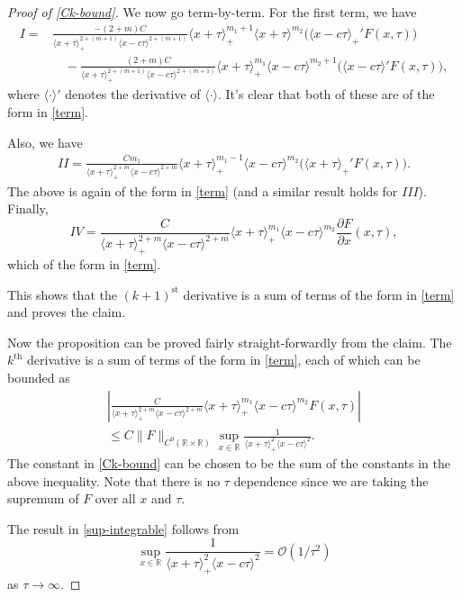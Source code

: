 \documentclass[oneside,reqno]{amsart}
\newcommand{\R}{\mathbb{R}}
\begin{document}
\begin{proof}[Proof of \cref{Ck-bound}]
	We now go term-by-term. For the first term, we have
	\begin{align*}
		I =& \frac {-(2+m)C} {\langle x +\tau\rangle_+^{2+(m+1)} \langle x -c\tau \rangle^{2+(m+1)}}\langle x + \tau \rangle_+^{m_1+1}\langle x+\tau\rangle^{m_2} \Big(\langle x-c\tau\rangle_+'F(x,\tau)\Big) \\
		&\quad-\frac {(2+m)C} {\langle x +\tau\rangle_+^{2+(m+1)} \langle x -c\tau \rangle^{2+(m+1)}}\langle x + \tau \rangle_+^{m_1}\langle x-c\tau\rangle^{m_2+1} \Big(\langle x-c\tau\rangle'F(x,\tau)\Big),
	\end{align*}
	where \(\langle \cdot \rangle'\) denotes the derivative of \(\langle \cdot \rangle\). It's clear that both of these are of the form in \cref{term}.
	
	Also, we have 
	\begin{align*}
		II = \frac {Cm_1} {\langle x +\tau\rangle_+^{2+m} \langle x -c\tau \rangle^{2+m}}\langle x + \tau \rangle_+^{m_1-1}\langle x-c\tau\rangle^{m_2} \Big( \langle x+\tau\rangle_+'F(x,\tau)\Big).
	\end{align*}
	The above is again of the form in \cref{term} (and a similar result holds for \(III\)). Finally,
	\begin{equation*}
		IV = \frac C {\langle x +\tau\rangle_+^{2+m} \langle x -c\tau \rangle^{2+m}}\langle x + \tau \rangle_+^{m_1}\langle x-c\tau\rangle^{m_2} \frac{\partial F}{\partial x}(x,\tau),
	\end{equation*}
	which of the form in \cref{term}.
	
	This shows that the \((k+1)^\text{st}\) derivative is a sum of terms of the form in \cref{term} and proves the claim.
	
	Now the proposition can be proved fairly straight-forwardly from the claim. The \(k^\text{th}\) derivative is a sum of terms of the form in \cref{term}, each of which can be bounded as
	\begin{align*}
		\left|\frac C {\langle x +\tau\rangle_+^{2+m} \langle x -c\tau \rangle^{2+m}}\langle x + \tau \rangle_+^{m_1}\langle x-c\tau\rangle^{m_2} F(x,\tau)\right| \\
		\leq C \| F \|_{C^0(\R\times \R)} \sup_{x\in\mathbb R} \frac 1 {\langle x+\tau\rangle_+^2 \langle x -c\tau \rangle^2}.
	\end{align*}
	The constant in \cref{Ck-bound} can be chosen to be the sum of the constants in the above inequality. Note that there is no \(\tau\) dependence since we are taking the supremum of \(F\) over all \(x\) and \(\tau\).
	
	The result in \cref{sup-integrable} follows from 
	\begin{equation*}
		\sup_{x\in\R} \frac 1 {\langle x+\tau\rangle_+^2 \langle x -c\tau \rangle^2} = \mathcal O (1/\tau^2)
	\end{equation*}
	as \(\tau\to \infty\).
\end{proof}
\end{document}
